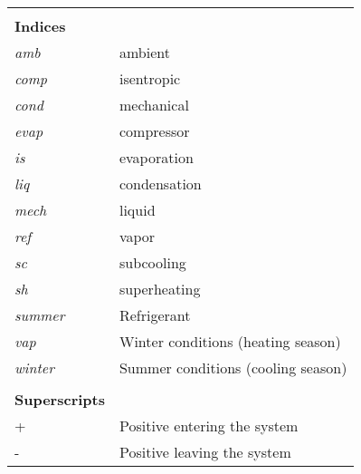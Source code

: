 \begin{table}[thp!]
\begin{tabular}{ll}
		&  \\
		\textbf{Indices} &  \\
		\textit{amb} & ambient \\
		\textit{comp} & isentropic \\
		\textit{cond} & mechanical \\
		\textit{evap} & compressor \\
		\textit{is} & evaporation \\
		\textit{liq} & condensation \\
		\textit{mech} & liquid \\
		\textit{ref} & vapor \\
		\textit{sc} & subcooling \\
		\textit{sh} & superheating \\
		\textit{summer} & Refrigerant \\
		\textit{vap} & Winter conditions (heating season) \\
		\textit{winter} & Summer conditions (cooling season) \\
		&  \\
		\textbf{Superscripts} &  \\
		+ & Positive entering the system \\
		- & Positive leaving the system
	\end{tabular}
\end{table}